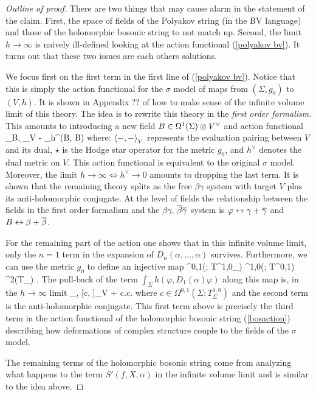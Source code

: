\begin{proof}[Outline of proof] There are two things that may cause alarm in the statement of the claim. First, the space of fields of the Polyakov string (in the BV language) and those of the holomorphic bosonic string to not match up. Second, the limit $h \to \infty$ is naively ill-defined looking at the action functional (\ref{polyakov bv}). 
It turns out that these two issues are each others solutions. 

We focus first on the first term in the first line of (\ref{polyakov bv}). 
Notice that this is simply the action functional for the $\sigma$ model of maps from $(\Sigma, g_0)$ to $(V, h)$. 
It is shown in Appendix ?? of \cite{ggw} how to make sense of the infinite volume limit of this theory. 
The idea is to rewrite this theory in the {\em first order formalism}.
This amounts to introducing a new field $B \in \Omega^1(\Sigma) \tensor V^\vee$ and action functional 
\ben
\int_\Sigma \<B, \d \varphi\>_V -  \int_\Sigma h^\vee(B, \star B)
\een
where: $\<-,-\>_V$ represents the evaluation pairing between $V$ and its dual, $\star$ is the Hodge star operator for the metric $g_0$, and $h^\vee$ denotes the dual metric on $V$. 
This action functional is equivalent to the original $\sigma$ model. 
Moreover, the limit $h \to \infty \iff h^\vee \to 0$ amounts to dropping the last term. 
It is shown that the remaining theory splits as the free $\beta\gamma$ system with target $V$ plus its anti-holomorphic conjugate. 
At the level of fields the relationship between the fields in the first order formalism and the $\beta\gamma$, $\Bar{\beta} \Bar{\gamma}$ system is $\varphi \leftrightarrow \gamma + \Bar{\gamma}$ and $B \leftrightarrow \beta + \Bar{\beta}$. 

For the remaining part of the action one shows that in this infinite volume limit, only the $n=1$ term in the expansion of $D_n(\alpha,\ldots,\alpha)$ survives. 
Furthermore, we can use the metric $g_0$ to define an injective map
\ben
\Omega^{0,1}(\Sigma ; T^{1,0}_\Sigma) \oplus \Omega^{1,0}(\Sigma ; T^{0,1}) \hookrightarrow \Sym^2(T_\Sigma) .
\een
The pull-back of the term $\int_\Sigma h(\varphi, D_1(\alpha) \varphi)$ along this map is, in the $h \to \infty$ limit
\ben
\int_\Sigma \<\beta , [c, \gamma]\>_V + {\rm c.c.}
\een
where $c \in \Omega^{0,1}(\Sigma ; T^{1,0}_\Sigma)$ and the second term is the anti-holomorphic conjugate. 
This first term above is precisely the third term in the action functional of the holomorphic bosonic string (\ref{bosaction}) describing how deformations of complex structure couple to the fields of the $\sigma$ model. 

The remaining terms of the holomorphic bosonic string come from analyzing what happens to the term $S'(f, X, \alpha)$ in the infinite volume limit and is similar to the idea above. 
\end{proof}


